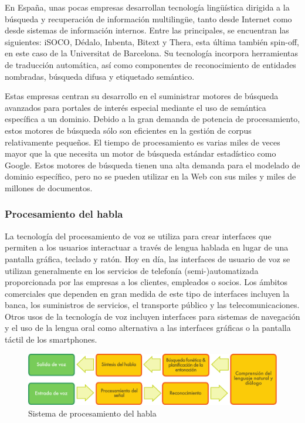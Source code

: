 \begin{multicols}{2}
En España, unas pocas empresas desarrollan tecnología lingüística dirigida a la búsqueda y recuperación de información multilingüe, tanto desde Internet como desde sistemas de información internos. Entre las principales, se encuentran las siguientes: iSOCO, Dédalo, Inbenta, Bitext y Thera, esta última también spin-off, en este caso de la Universitat de Barcelona. Su tecnología incorpora herramientas de traducción automática, así como componentes de reconocimiento de entidades nombradas, búsqueda difusa y etiquetado semántico.

Estas empresas centran su desarrollo en el suministrar motores de búsqueda avanzados para portales de interés especial mediante el uso de semántica específica a un dominio. Debido a la gran demanda de potencia de procesamiento, estos motores de búsqueda sólo son eficientes en la gestión de corpus relativamente pequeños. El tiempo de procesamiento es varias miles de veces mayor que la que necesita un motor de búsqueda estándar estadístico como Google. Estos motores de búsqueda tienen una alta demanda para el modelado de dominio específico, pero no se pueden utilizar en la Web con sus miles y miles de millones de documentos.

\subsubsection{Procesamiento del habla}

La tecnología del procesamiento de voz se utiliza para crear interfaces que permiten a los usuarios interactuar a través de lengua hablada en lugar de una pantalla gráfica, teclado y ratón. Hoy en día, las interfaces de usuario de voz  se utilizan generalmente en los servicios de telefonía (semi-)automatizada proporcionada por las empresas a los clientes, empleados o socios. Los ámbitos comerciales que dependen en gran medida de este tipo de interfaces incluyen la banca, los suministros de servicios, el transporte público y las telecomunicaciones. Otros usos de la tecnología de voz incluyen interfaces para sistemas de navegación y el uso de la lengua oral como alternativa a las interfaces gráficas o la pantalla táctil de los smartphones.

\begin{figure}[htb]
  \center  
  \includegraphics[width=\textwidth]{../_media/spanish/simple_speech-based_dialogue_architecture}
  \caption{Sistema de procesamiento del habla}
  \label{fig:dialoguearch_de}
\end{figure}


\end{multicols}

